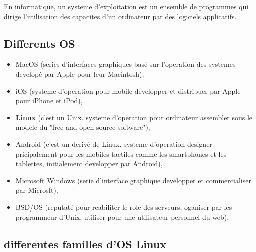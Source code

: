 En informatique, un systeme d'exploitation est un ensemble de programmes qui dirige l'utilisation des capacites d'un ordinateur par des logiciels applicatifs.\newline

\subsection{Differents OS}

\begin{itemize}
\item MacOS (series d'interfaces graphiques basé sur l'operation des systemes developé par Apple pour leur Macintosh),
\item iOS (systeme d'operation pour mobile developper et distribuer par Apple pour iPhone et iPod),
\item \textbf{Linux} (c'est un Unix. systeme d'operation pour ordinateur assembler sous le modele du "free and open source software"),
\item Android (c'est un derivé de Linux. systeme d'operation designer pricipalement pour les mobiles tactiles comme les smartphones et les tablettes, initialement developper par Android),
\item Microsoft Windows (serie d'interface graphique developper et commercialiser par Microsft),
\item BSD/OS (reputaté pour reabiliter le role des serveurs, oganiser par les programmeur d'Unix, utiliser pour une utilisateur personnel du web).\newline
\end{itemize}


\subsection{differentes familles d'OS Linux} 

